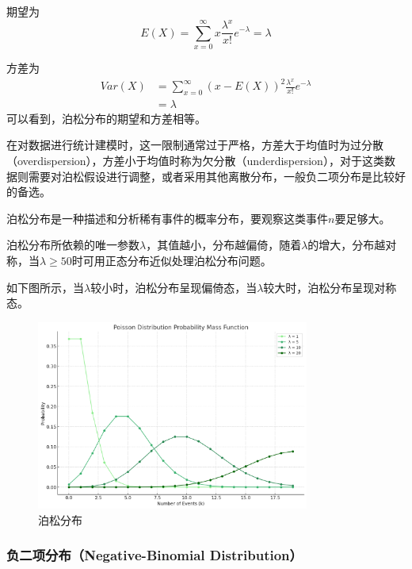 期望为
\begin{equation}
    E(X) = \sum_{x=0}^{\infty} x \frac{\lambda^x}{x!}e^{-\lambda} = \lambda
\end{equation}

方差为
\begin{equation}
    \begin{aligned}
        Var(X) & = \sum_{x=0}^{\infty} (x - E(X))^2 \frac{\lambda^x}{x!}e^{-\lambda} \\
               & = \lambda
    \end{aligned}
\end{equation}
可以看到，泊松分布的期望和方差相等。

\begin{note}
    在对数据进行统计建模时，这一限制通常过于严格，方差大于均值时为过分散（overdispersion），方差小于均值时称为欠分散（underdispersion），对于这类数据则需要对泊松假设进行调整，或者采用其他离散分布，一般负二项分布是比较好的备选。
\end{note}

泊松分布是一种描述和分析稀有事件的概率分布，要观察这类事件$n$要足够大。

泊松分布所依赖的唯一参数$\lambda$，其值越小，分布越偏倚，随着$\lambda$的增大，分布越对称，当$\lambda \geqslant 50$时可用正态分布近似处理泊松分布问题。

如下图所示，当$\lambda$较小时，泊松分布呈现偏倚态，当$\lambda$较大时，泊松分布呈现对称态。

\begin{figure}[h]
    \centering
    \includegraphics[width=0.8\textwidth]{pic/2.3.1.png}
    \caption{泊松分布}
\end{figure}

\subsubsection{负二项分布（Negative-Binomial Distribution）}

